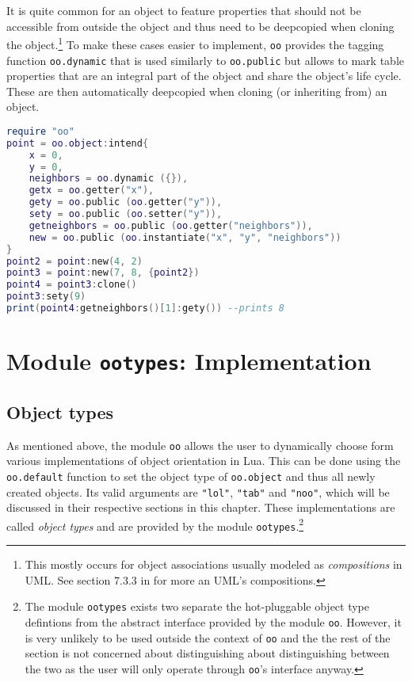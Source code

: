 It is quite common for an object to feature properties that should not be accessible from outside the object and thus need to be deepcopied when cloning the object.\footnote{This mostly occurs for object associations usually modeled as \emph{compositions} in UML. See section 7.3.3 in \cite{UML} for more an UML's compositions.} To make these cases easier to implement, \texttt{oo} provides the tagging function \texttt{oo.dynamic} that is used similarly to \texttt{oo.public} but allows to mark table properties that are an integral part of the object and share the object's life cycle. These are then automatically deepcopied when cloning (or inheriting from) an object.

\begin{lstlisting}[language=lua, caption={Rewriting listing \ref{lst:clone} using \texttt{oo.dynamic}}, label=lst:dynamic, name=lst:dynamic]
require "oo"
point = oo.object:intend{
	x = 0,
	y = 0,
	neighbors = oo.dynamic ({}),
	getx = oo.getter("x"),
	gety = oo.public (oo.getter("y")),
	sety = oo.public (oo.setter("y")),
	getneighbors = oo.public (oo.getter("neighbors")),
	new = oo.public (oo.instantiate("x", "y", "neighbors"))
}
point2 = point:new(4, 2)
point3 = point:new(7, 8, {point2})
point4 = point3:clone()
point3:sety(9)
print(point4:getneighbors()[1]:gety()) --prints 8
\end{lstlisting}


\section{Module \texttt{ootypes}: Implementation}
\label{sec:oo:implementation}

\subsection{Object types}

As mentioned above, the module \texttt{oo} allows the user to dynamically choose form various implementations of object orientation in Lua. This can be done using the \texttt{oo.default} function to set the object type of \texttt{oo.object} and thus all newly created objects. Its valid arguments are \texttt{"lol"}, \texttt{"tab"} and \texttt{"noo"}, which will be discussed in their respective sections in this chapter. These implementations are called \emph{object types} and are provided by the module \texttt{ootypes}.\footnote{The module \texttt{ootypes} exists two separate the hot-pluggable object type defintions from the abstract interface provided by the module \texttt{oo}. However, it is very unlikely to be used outside the context of \texttt{oo} and the the rest of the section is not concerned about distinguishing about distinguishing between the two as the user will only operate through \texttt{oo}'s interface anyway.}

